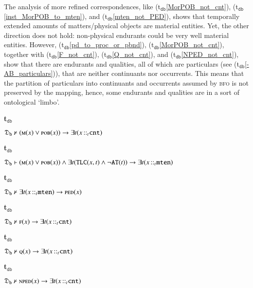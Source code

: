 \documentclass[ao]{iosart2x}
\newcommand{\bflist}{\begin{list}{}{\setlength{\topsep}{2mm}\setlength{\parsep}{0mm}\setlength{\leftmargin}{9.2mm}\setlength{\labelwidth}{8mm}}}
\newcommand{\eflist}{\end{list}}
\newcommand{\dbThrLabel}{\textrm{t$_\texttt{db}$}}
\newcounter{cntdbth}
\newcommand{\dbth}[1]{\refstepcounter{cntdbth}\begin{small}{\bf \dbThrLabel\thecntdbth\label{#1}}\end{small}}
\newcommand{\refdbth}[1]{({\dbThrLabel}\ref{#1})}
\newcommand{\pr}[1]{\mathtt{#1}}
\newcommand{\cn}[1]{\mathtt{#1}}
\newcommand{\bfo}{{\textsc{bfo}}}
\newcommand {\thdolcedbmap} {\ensuremath{\mathfrak{D}_\texttt{b}}}
\newcommand {\Mdcat} {\textsc{m}}
\newcommand {\Fdcat} {\textsc{f}}
\newcommand {\NPEDdcat} {\textsc{nped}}
\newcommand {\PEDdcat} {\textsc{ped}}
\newcommand {\POBdcat} {\textsc{pob}}
\newcommand {\Qdcat} {\textsc{q}}
\newcommand {\ATd} {\ensuremath{\pr{AT}}}
\newcommand {\TLCd} {\ensuremath{\pr{TLC}}}
\newcommand{\cntbcat}{\cn{cnt}}
\newcommand{\mtenbcat}{\cn{mten}}
\newcommand{\bfoiof}[1]{{\,::_{#1\:\!}}}
\begin{document}
The analysis of more refined correspondences, like \refdbth{MorPOB_not_cnt}, \refdbth{inst_MorPOB_to_mten}, and \refdbth{mten_not_PED}, shows that temporally extended amounts of matters/physical objects are material entities. Yet, the other direction does not hold: non-physical endurants could be very well material entities. However,  \refdbth{pd_to_proc_or_pbnd}, \refdbth{MorPOB_not_cnt}, together with \refdbth{F_not_cnt}, \refdbth{Q_not_cnt}, and \refdbth{NPED_not_cnt}, show that there are endurants and qualities, all of which are particulars (see \refdbth{-AB_particulars}), that are neither continuants nor occurrents. This means that the partition of particulars into continuants and occurrents assumed by {\bfo} is not preserved by the mapping, hence, some endurants and qualities  are in a sort of ontological `limbo'. 
%
\bflist
\item[\dbth{MorPOB_not_cnt}] $\thdolcedbmap \nvdash (\Mdcat(x) \lor \POBdcat(x)) \to \exists t(x \bfoiof{t} \cntbcat)$

\item[\dbth{inst_MorPOB_to_mten}] $\thdolcedbmap \vdash (\Mdcat(x) \lor \POBdcat(x)) \land \exists t(\TLCd(x,t) \land \neg \ATd(t)) \to \exists t(x \bfoiof{t} \mtenbcat)$

\item[\dbth{mten_not_PED}] $\thdolcedbmap \nvdash \exists t(x \bfoiof{t} \mtenbcat) \to \PEDdcat(x)$

\item[\dbth{F_not_cnt}] $\thdolcedbmap \nvdash \Fdcat(x) \to \exists t(x \bfoiof{t} \cntbcat)$

\item[\dbth{Q_not_cnt}] $\thdolcedbmap \nvdash \Qdcat(x) \to \exists t(x \bfoiof{t} \cntbcat)$

\item[\dbth{NPED_not_cnt}] $\thdolcedbmap \nvdash \NPEDdcat(x) \to \exists t(x \bfoiof{t} \cntbcat)$
\eflist
\end{document}
